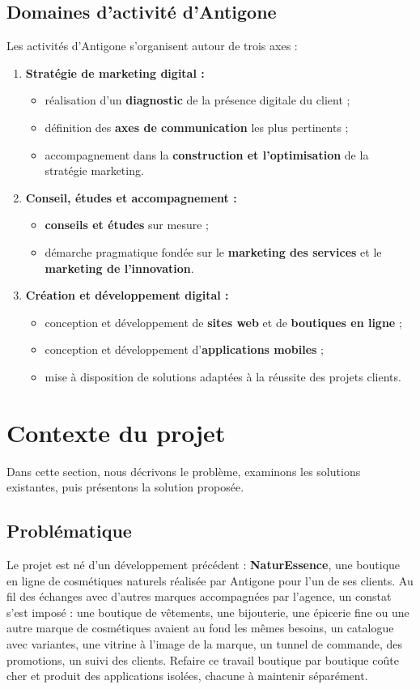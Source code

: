 \subsection{Domaines d'activité d'Antigone}
Les activités d'Antigone s'organisent autour de trois axes :
\begin{enumerate}
  \item \textbf{Stratégie de marketing digital :}
  \begin{itemize}
    \item réalisation d'un \textbf{diagnostic} de la présence digitale du client ;
    \item définition des \textbf{axes de communication} les plus pertinents ;
    \item accompagnement dans la \textbf{construction et l'optimisation} de la stratégie marketing.
  \end{itemize}
  \item \textbf{Conseil, études et accompagnement :}
  \begin{itemize}
    \item \textbf{conseils et études} sur mesure ;
    \item démarche pragmatique fondée sur le \textbf{marketing des services} et le \textbf{marketing de l'innovation}.
  \end{itemize}
  \item \textbf{Création et développement digital :}
  \begin{itemize}
    \item conception et développement de \textbf{sites web} et de \textbf{boutiques en ligne} ;
    \item conception et développement d'\textbf{applications mobiles} ;
    \item mise à disposition de solutions adaptées à la réussite des projets clients.
  \end{itemize}
\end{enumerate}

\section{Contexte du projet}
Dans cette section, nous décrivons le problème, examinons les solutions existantes, puis présentons la solution proposée.

\subsection{Problématique}
Le projet est né d'un développement précédent : \textbf{NaturEssence}, une boutique en ligne de cosmétiques naturels réalisée par Antigone pour l'un de ses clients. Au fil des échanges avec d'autres marques accompagnées par l'agence, un constat s'est imposé : une boutique de vêtements, une bijouterie, une épicerie fine ou une autre marque de cosmétiques avaient au fond les mêmes besoins, un catalogue avec variantes, une vitrine à l'image de la marque, un tunnel de commande, des promotions, un suivi des clients. Refaire ce travail boutique par boutique coûte cher et produit des applications isolées, chacune à maintenir séparément.\newline

